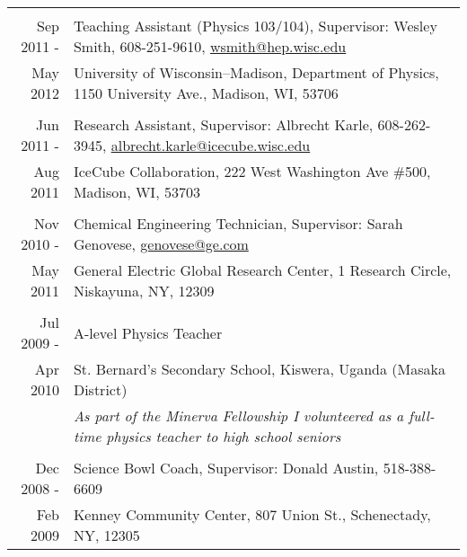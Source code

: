 \documentclass[letterpaper,11pt]{article} %
\begin{document}
\begin{tabulary}{\textwidth}{RL}
\vspace{5pt} \\

Sep 2011 -     & Teaching Assistant (Physics 103/104), Supervisor: Wesley Smith, 608-251-9610, \href{mailto:wsmith@hep.wisc.edu}{wsmith@hep.wisc.edu} \\
 May 2012      & University of Wisconsin--Madison, Department of Physics, 1150 University Ave., Madison, WI, 53706 \\ %

\vspace{5pt} \\

Jun 2011 -     & Research Assistant, Supervisor: Albrecht Karle, 608-262-3945, \href{mailto:albrecht.karle@icecube.wisc.edu}{albrecht.karle@icecube.wisc.edu} \\
 Aug 2011      & IceCube Collaboration, 222 West Washington Ave \#500, Madison, WI, 53703 \\ %

\vspace{5pt} \\

Nov 2010 -     & Chemical Engineering Technician, Supervisor: Sarah Genovese, \href{mailto:genovese@ge.com}{genovese@ge.com} \\
 May 2011      & General Electric Global Research Center, 1 Research Circle, Niskayuna, NY, 12309 \\ %

\vspace{5pt} \\

Jul 2009 -     & A-level Physics Teacher \\
 Apr 2010      & St. Bernard's Secondary School, Kiswera, Uganda (Masaka District) \\
 {}            & \emph{As part of the Minerva Fellowship I volunteered as a full-time physics teacher to high school seniors} \\ %

\vspace{5pt} \\

Dec 2008 -     & Science Bowl Coach, Supervisor: Donald Austin, 518-388-6609 \\
 Feb 2009      & Kenney Community Center, 807 Union St., Schenectady, NY, 12305 \\ %


\end{tabulary}
\end{document}
